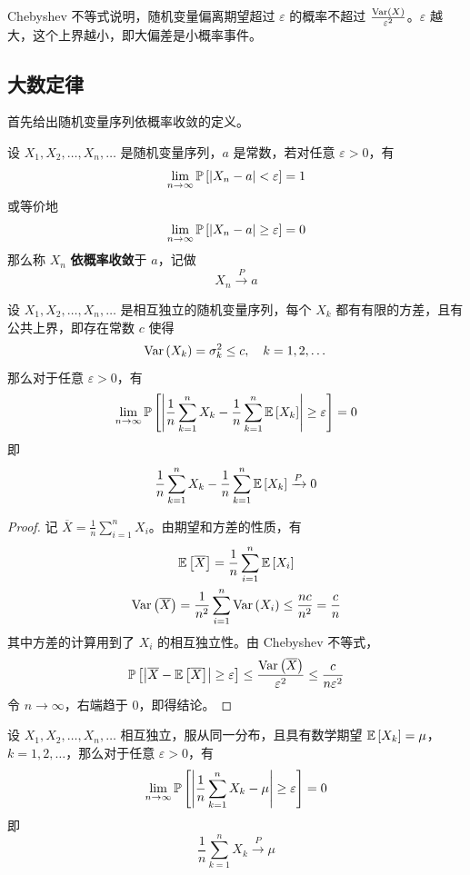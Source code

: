Chebyshev 不等式说明，随机变量偏离期望超过 $\varepsilon$ 的概率不超过 $\frac{\operatorname{Var}\left(X\right)}{\varepsilon^2}$。$\varepsilon$ 越大，这个上界越小，即大偏差是小概率事件。

\subsection{大数定律}

首先给出随机变量序列依概率收敛的定义。

\begin{definition}[依概率收敛]
    设 $X_1, X_2, \dots, X_n, \dots$ 是随机变量序列，$a$ 是常数，若对任意 $\varepsilon > 0$，有
    $$
    \lim_{n \to \infty} \operatorname{\mathbb{P}}\left[\abs{X_n - a} < \varepsilon\right] = 1
    $$
    或等价地
    $$
    \lim_{n \to \infty} \operatorname{\mathbb{P}}\left[\abs{X_n - a} \ge \varepsilon\right] = 0
    $$
    那么称 $X_n$ \textbf{依概率收敛}于 $a$，记做
    $$
    X_n \xrightarrow{P} a
    $$
\end{definition}

\begin{theorem}
    设 $X_1, X_2, \dots, X_n, \dots$ 是相互独立的随机变量序列，每个 $X_k$ 都有有限的方差，且有公共上界，即存在常数 $c$ 使得
    $$
    \operatorname{Var}\left(X_k\right) = \sigma_k^2 \le c, \quad k = 1, 2, \dots
    $$
    那么对于任意 $\varepsilon > 0$，有
    $$
    \lim_{n \to \infty} \operatorname{\mathbb{P}}\left[\abs{\frac{1}{n} \sum_{k = 1}^{n} X_k - \frac{1}{n} \sum_{k = 1}^{n} \operatorname{\mathbb{E}}\left[X_k\right]} \ge \varepsilon\right] = 0
    $$
    即
    $$
    \frac{1}{n} \sum_{k = 1}^{n} X_k - \frac{1}{n} \sum_{k = 1}^{n} \operatorname{\mathbb{E}}\left[X_k\right] \xrightarrow{P} 0
    $$
    \begin{proof}
        记 $\overline{X} = \frac{1}{n} \sum_{i = 1}^{n} X_i$。由期望和方差的性质，有
        $$
        \begin{gathered}
            \operatorname{\mathbb{E}}\left[\overline{X}\right] = \frac{1}{n} \sum_{i = 1}^{n} \operatorname{\mathbb{E}}\left[X_i\right] \\
            \operatorname{Var}\left(\overline{X}\right) = \frac{1}{n^2} \sum_{i = 1}^{n} \operatorname{Var}\left(X_i\right) \le \frac{n c}{n^2} = \frac{c}{n}
        \end{gathered}
        $$
        其中方差的计算用到了 $X_i$ 的相互独立性。由 Chebyshev 不等式，
        $$
        \operatorname{\mathbb{P}}\left[\abs{\overline{X} - \operatorname{\mathbb{E}}\left[\overline{X}\right]} \ge \varepsilon\right] \le \frac{\operatorname{Var}\left(\overline{X}\right)}{\varepsilon^2} \le \frac{c}{n \varepsilon^2}
        $$
        令 $n \to \infty$，右端趋于 $0$，即得结论。
    \end{proof}
\end{theorem}

\begin{theorem}
    设 $X_1, X_2, \dots, X_n, \dots$ 相互独立，服从同一分布，且具有数学期望 $\operatorname{\mathbb{E}}\left[X_k\right] = \mu$，$k = 1, 2, \dots$，那么对于任意 $\varepsilon > 0$，有
    $$
    \lim_{n \to \infty} \operatorname{\mathbb{P}}\left[\abs{\frac{1}{n} \sum_{k = 1}^{n} X_k - \mu} \ge \varepsilon\right] = 0
    $$
    即
    $$
    \frac{1}{n} \sum_{k = 1}^{n} X_k \xrightarrow{P} \mu
    $$
\end{theorem}

